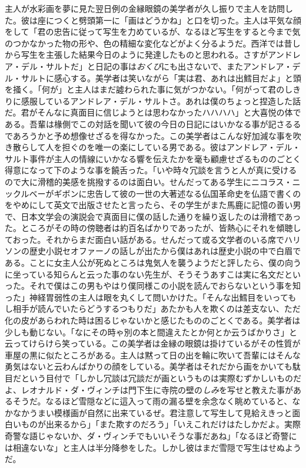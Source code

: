 \documentclass[12pt, openright]{book}
\begin{document}
主人が水彩画を夢に見た翌日例の金縁眼鏡の美学者が久し振りで主人を訪問した。彼は座につくと劈頭第一に「画はどうかね」と口を切った。主人は平気な顔をして「君の忠告に従って写生を力めているが、なるほど写生をすると今まで気のつかなかった物の形や、色の精細な変化などがよく分るようだ。西洋では昔しから写生を主張した結果今日のように発達したものと思われる。さすがアンドレア・デル・サルトだ」と日記の事は\emph{おくび}にも出さないで、またアンドレア・デル・サルトに感心する。美学者は笑いながら「実は君、あれは出鱈目だよ」と頭を掻く。「何が」と主人はまだ譃わられた事に気がつかない。「何がって君のしきりに感服しているアンドレア・デル・サルトさ。あれは僕のちょっと捏造した話だ。君がそんなに真面目に信じようとは思わなかったハハハハ」と大喜悦の体である。吾輩は椽側でこの対話を聞いて彼の今日の日記にはいかなる事が記さるるであろうかと予め想像せざるを得なかった。この美学者はこんな好加減な事を吹き散らして人を担ぐのを唯一の楽にしている男である。彼はアンドレア・デル・サルト事件が主人の情線にいかなる響を伝えたかを毫も顧慮せざるもののごとく得意になって下のような事を饒舌った。「いや時々冗談を言うと人が真に受けるので大に滑稽的美感を挑撥するのは面白い。せんだってある学生にニコラス・ニックルベーがギボンに忠告して彼の一世の大著述なる仏国革命史を仏語で書くのをやめにして英文で出版させたと言ったら、その学生がまた馬鹿に記憶の善い男で、日本文学会の演説会で真面目に僕の話した通りを繰り返したのは滑稽であった。ところがその時の傍聴者は約百名ばかりであったが、皆熱心にそれを傾聴しておった。それからまだ面白い話がある。せんだって或る文学者のいる席でハリソンの歴史小説セオファーノの話しが出たから僕はあれは歴史小説の中で白眉である。ことに女主人公が死ぬところは鬼気人を襲うようだと評したら、僕の向うに坐っている知らんと云った事のない先生が、そうそうあすこは実に名文だといった。それで僕はこの男もやはり僕同様この小説を読んでおらないという事を知った」神経胃弱性の主人は眼を丸くして問いかけた。「そんな出鱈目をいってもし相手が読んでいたらどうするつもりだ」あたかも人を欺くのは差支ない、ただ化の皮があらわれた時は困るじゃないかと感じたもののごとくである。美学者は少しも動じない。「なにその時ゃ別の本と間違えたとか何とか云うばかりさ」と云ってけらけら笑っている。この美学者は金縁の眼鏡は掛けているがその性質が車屋の黒に似たところがある。主人は黙って日の出を輪に吹いて吾輩にはそんな勇気はないと云わんばかりの顔をしている。美学者はそれだから画をかいても駄目だという目付で「しかし冗談は冗談だが画というものは実際むずかしいものだよ、レオナルド・ダ・ヴィンチは門下生に寺院の壁の\emph{しみ}を写せと教えた事があるそうだ。なるほど雪隠などに這入って雨の漏る壁を余念なく眺めていると、なかなかうまい模様画が自然に出来ているぜ。君注意して写生して見給えきっと面白いものが出来るから」「また欺すのだろう」「いえこれだけはたしかだよ。実際奇警な語じゃないか、ダ・ヴィンチでもいいそうな事だあね」「なるほど奇警には相違ないな」と主人は半分降参をした。しかし彼はまだ雪隠で写生はせぬようだ。
\end{document}

